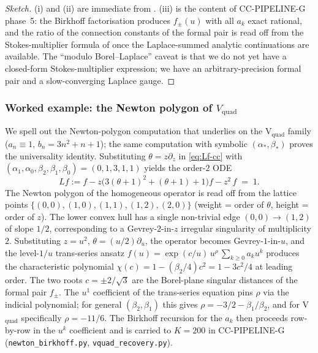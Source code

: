 \documentclass[11pt,reqno]{amsart}
\theoremstyle{plain}
\theoremstyle{definition}
\theoremstyle{remark}
\newcommand{\Vquad}{V_{\mathrm{quad}}}
\begin{document}
\begin{proof}[Sketch]
(i) and (ii) are immediate from . (iii) is the
content of CC-PIPELINE-G phase~5: the Birkhoff factorisation
produces $f_\pm(u)$ with all $a_k$ exact rational, and the
ratio of the connection constants of the formal pair is read
off from the Stokes-multiplier formula of
\cite{lodayrichaud2016divergent} once the Laplace-summed
analytic continuations are available. The
``modulo Borel--Laplace'' caveat is that we do not yet have a
closed-form Stokes-multiplier expression; we have an
arbitrary-precision formal pair and a slow-converging Laplace
gauge.
\end{proof}

\subsubsection*{Worked example: the Newton polygon of $\Vquad$}

We spell out the Newton-polygon computation that underlies
 on the V$_\mathrm{quad}$ family
($a_n \equiv 1$, $b_n = 3 n^2 + n + 1$); the same computation
with symbolic $(\alpha_*, \beta_*)$ proves the universality
identity. Substituting $\theta = z\partial_z$ in
\eqref{eq:Lf-cc} with $(\alpha_1, \alpha_0, \beta_2, \beta_1,
\beta_0) = (0, 1, 3, 1, 1)$ yields the order-$2$ ODE
\[
  L f := f - z \bigl( 3(\theta+1)^2 + (\theta+1) + 1 \bigr) f
        - z^2 \, f \;=\; 1.
\]
The Newton polygon of the homogeneous operator is read off
from the lattice points
$\{(0, 0), (1, 0), (1, 1), (1, 2), (2, 0)\}$
(weight = order of $\theta$, height = order of $z$).
The lower convex hull has a single non-trivial edge
$(0, 0) \to (1, 2)$ of slope $1/2$, corresponding to a
Gevrey-$2$-in-$z$ irregular singularity of multiplicity $2$.
Substituting $z = u^2$, $\theta = (u/2)\partial_u$, the
operator becomes Gevrey-$1$-in-$u$, and the level-$1/u$
trans-series ansatz $f(u) = \exp(c/u)\,u^{\rho}\,\sum_{k \ge 0} a_k u^k$
produces the characteristic polynomial
$\chi(c) = 1 - (\beta_2/4) c^2 = 1 - 3 c^2 / 4$ at leading
order. The two roots $c = \pm 2/\sqrt{3}$ are the
Borel-plane singular distances of the formal pair $f_\pm$.
The $u^1$ coefficient of the trans-series equation pins
$\rho$ via the indicial polynomial; for general
$(\beta_2, \beta_1)$ this gives
$\rho = -3/2 - \beta_1/\beta_2$, and for V$_\mathrm{quad}$
specifically $\rho = -11/6$. The Birkhoff recursion for the
$a_k$ then proceeds row-by-row in the $u^k$ coefficient and
is carried to $K = 200$ in CC-PIPELINE-G
(\texttt{newton\_birkhoff.py}, \texttt{vquad\_recovery.py}).
\end{document}

